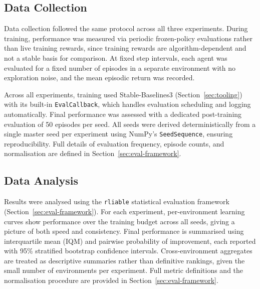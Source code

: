 \subsection{Data Collection}

{\color{red} 
Data collection followed the same protocol across all three experiments. During training, performance was measured via periodic frozen-policy evaluations rather than live training rewards, since training rewards are algorithm-dependent and not a stable basis for comparison. At fixed step intervals, each agent was evaluated for a fixed number of episodes in a separate environment with no exploration noise, and the mean episodic return was recorded.

Across all experiments, training used Stable-Baselines3 (Section~\ref{sec:tooling}) with its built-in \texttt{EvalCallback}, which handles evaluation scheduling and logging automatically. Final performance was assessed with a dedicated post-training evaluation of 50 episodes per seed. All seeds were derived deterministically from a single master seed per experiment using NumPy's \texttt{SeedSequence}, ensuring reproducibility. Full details of evaluation frequency, episode counts, and normalisation are defined in Section~\ref{sec:eval-framework}.
}













\subsection{Data Analysis}

{\color{red} 
Results were analysed using the \texttt{rliable} statistical evaluation framework \citep{agarwal2021precipice} (Section~\ref{sec:eval-framework}). For each experiment, per-environment learning curves show performance over the training budget across all seeds, giving a picture of both speed and consistency. Final performance is summarised using interquartile mean (IQM) and pairwise probability of improvement, each reported with 95\% stratified bootstrap confidence intervals. Cross-environment aggregates are treated as descriptive summaries rather than definitive rankings, given the small number of environments per experiment. Full metric definitions and the normalisation procedure are provided in Section~\ref{sec:eval-framework}.
}



